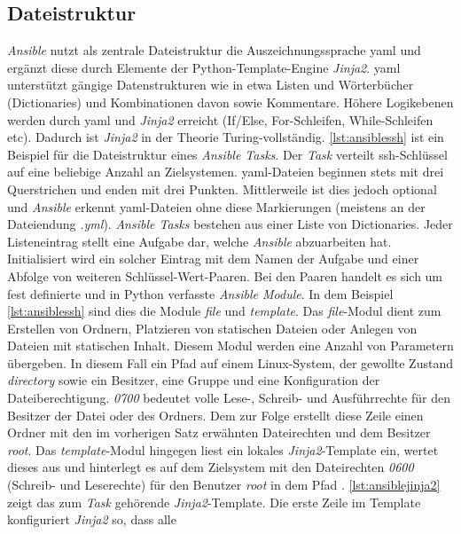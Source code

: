 \documentclass[titlepage]{report}
\begin{document}
\subsection{Dateistruktur}
\emph{Ansible} nutzt als zentrale Dateistruktur die Auszeichnungssprache
\gls{yaml} und ergänzt diese durch Elemente der
Python\hyp{}Template\hyp{}Engine \emph{Jinja2}. \gls{yaml} unterstützt
gängige Datenstrukturen wie in etwa Listen und Wörterbücher
(Dictionaries) und Kombinationen davon sowie Kommentare. Höhere
Logikebenen werden durch \gls{yaml} und \emph{Jinja2} erreicht (If/Else,
For\hyp{}Schleifen, While\hyp{}Schleifen etc). Dadurch ist \emph{Jinja2}
in der Theorie Turing-vollständig. \autoref{lst:ansiblessh} ist ein
Beispiel für die Dateistruktur eines \emph{Ansible Tasks}. Der
\emph{Task} verteilt \gls{ssh}\hyp{}Schlüssel auf eine beliebige Anzahl
an Zielsystemen.  \gls{yaml}\hyp{}Dateien beginnen stets mit drei
Querstrichen und enden mit drei Punkten.  Mittlerweile ist dies jedoch
optional und \emph{Ansible} erkennt \gls{yaml}\hyp{}Dateien ohne diese
Markierungen (meistens an der Dateiendung \emph{.yml}). \emph{Ansible
Tasks} bestehen aus einer Liste von Dictionaries. Jeder Listeneintrag
stellt eine Aufgabe dar, welche \emph{Ansible} abzuarbeiten hat.
Initialisiert wird ein solcher Eintrag mit dem Namen der Aufgabe und
einer Abfolge von weiteren Schlüssel\hyp{}Wert\hyp{}Paaren. Bei den
Paaren handelt es sich um fest definierte und in Python verfasste
\emph{Ansible Module}. In dem Beispiel \autoref{lst:ansiblessh} sind
dies die Module \emph{file} und \emph{template}. Das
\emph{file}\hyp{}Modul dient zum Erstellen von Ordnern, Platzieren von
statischen Dateien oder Anlegen von Dateien mit statischen Inhalt.
Diesem Modul werden eine Anzahl von Parametern übergeben. In diesem Fall
ein Pfad auf einem Linux\hyp{}System, der gewollte Zustand
\emph{directory} sowie ein Besitzer, eine Gruppe und eine Konfiguration
der Dateiberechtigung. \emph{0700} bedeutet volle
Lese\hyp{}, Schreib\hyp{} und Ausführrechte für den Besitzer der Datei
oder des Ordners. Dem zur Folge erstellt diese Zeile einen Ordner mit
den im vorherigen Satz erwähnten Dateirechten und dem Besitzer
\emph{root}. Das \emph{template}\hyp{}Modul hingegen liest ein lokales
\emph{Jinja2}\hyp{}Template ein, wertet dieses aus und hinterlegt es auf
dem Zielsystem mit den Dateirechten \emph{0600} (Schreib\hyp{} und
Leserechte) für den Benutzer \emph{root} in dem Pfad
. \autoref{lst:ansiblejinja2}
zeigt das zum \emph{Task} gehörende \emph{Jinja2}\hyp{}Template. Die
erste Zeile im Template konfiguriert \emph{Jinja2} so, dass alle
\end{document}
